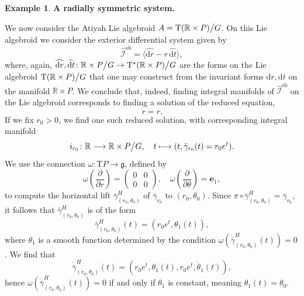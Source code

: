 \documentclass[11pt]{article}
\theoremstyle{plain}
\theoremstyle{definition}
\newtheorem{example}{Example}
\begin{document}
\begin{example} {\bf A radially symmetric system.}


We now consider the Atiyah Lie algebroid $A=\mathrm{T}(\mathbb{R}\times P)\big\slash G$. On this Lie algebroid we consider the exterior differential system given by
\begin{equation*}\label{eqn:laedsradial}
    \widehat{\mathcal{I}}^{\mathrm{sb}}=\langle \widehat{\mathrm{d}r}-r \, \widehat{\mathrm{d}t}\rangle,
\end{equation*}
where, again, $\widehat{\mathrm{d}r},\widehat{\mathrm{d}t}\colon \mathbb{R}\times P\big\slash G\to \mathrm{T}^{\ast}(\mathbb{R}\times P)\big\slash G$ are the   forms on the Lie algebroid $\mathrm{T}(\mathbb{R}\times P)\big\slash G$ that one may construct from the  invariant forms $\mathrm{d}r,\mathrm{d}t$  on the manifold $\mathbb{R}\times P$. We conclude that, indeed, finding integral manifolds  of  $\widehat{\mathcal{I}}^{\mathrm{sb}}$ on the Lie algebroid  corresponds to finding a solution of the reduced equation,
\begin{equation*}
    \dot r =r.
\end{equation*}
If we fix  $r_0>0$, we find one such reduced solution, with corresponding integral manifold
\begin{equation*}
    i_{r_0} \colon \mathbb{R}\longrightarrow \mathbb{R}\times P\big\slash G,\quad   t\longmapsto (t,\bar{\gamma}_{r_0}(t)=r_0e^t).
\end{equation*}
We use the connection $\omega\colon \mathrm{T}P\to \mathfrak{g}$, defined by
\begin{equation*}
    \omega\left(\frac{\partial}{\partial r}\right)=\begin{pmatrix} 0 & 0 \\ 0 & 0 \end{pmatrix},\quad \omega\left(\frac{\partial}{\partial \theta}\right)=\mathbf{e}_1,
\end{equation*}
to compute the horizontal lift $\bar{\gamma}^H_{(r_0,\theta_0)}$ of $\bar{\gamma}_{r_0}$ to $(r_0,\theta_0)$. Since $\pi\circ \bar{\gamma}^H_{(r_0,\theta_0)}=\bar{\gamma}_{r_0}$, it follows that $\bar{\gamma}^H_{(r_0,\theta_0)}$ is of the form
\begin{equation*}
    \bar{\gamma}_{(r_0,\theta_0)}^H(t)=(r_0e^t,\theta_1(t)),
\end{equation*}
where $\theta_1$ is a smooth function determined by the condition $\omega\left(\dot{\bar{\gamma}}^H_{(r_0,\theta_0)}(t)\right)=0$.
We find that
\begin{equation*}
    \dot{\bar{\gamma}}_{(r_0,\theta_0)}^H(t)=(r_0e^t,\theta_1(t),r_0e^t,\dot{\theta}_1(t)),
\end{equation*}
hence $\omega\left(\dot{\bar{\gamma}}^H_{(r_0,\theta_0)}(t)\right)=0$ if and only if $\theta_1$ is constant, meaning $\theta_1(t)=\theta_0$.



\end{example}
\end{document}
